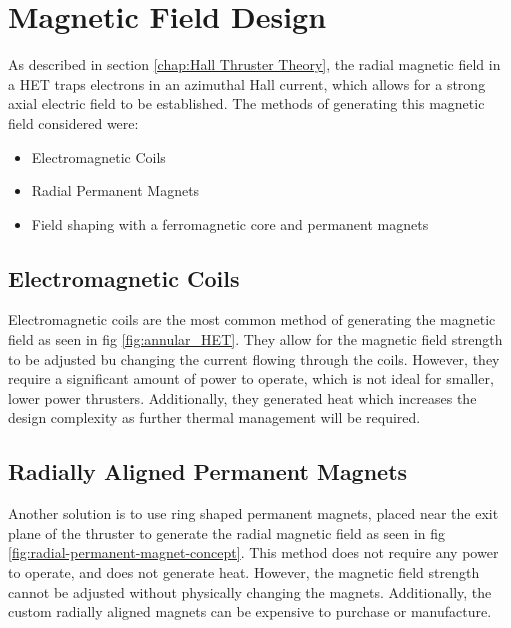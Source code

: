\section{Magnetic Field Design}

As described in section \ref{chap:Hall Thruster Theory}, the radial magnetic field in a \ac{HET} traps electrons in an azimuthal Hall current, which allows for a strong axial electric field to be established. The methods of generating this magnetic field considered were:

\begin{itemize}
    \item Electromagnetic Coils
    \item Radial Permanent Magnets
    \item Field shaping with a ferromagnetic core and permanent magnets
\end{itemize}

\subsection{Electromagnetic Coils}

Electromagnetic coils are the most common method of generating the magnetic field as seen in fig \ref{fig:annular_HET}. They allow for the magnetic field strength to be adjusted bu changing the current flowing through the coils. However, they require a significant amount of power to operate, which is not ideal for smaller, lower power thrusters. Additionally, they generated heat which increases the design complexity as further thermal management will be required.

\subsection{Radially Aligned Permanent Magnets}

Another solution is to use ring shaped permanent magnets, placed near the exit plane of the thruster to generate the radial magnetic field as seen in fig \ref{fig:radial-permanent-magnet-concept}. This method does not require any power to operate, and does not generate heat. However, the magnetic field strength cannot be adjusted without physically changing the magnets. Additionally, the custom radially aligned magnets can be expensive to purchase or manufacture.


